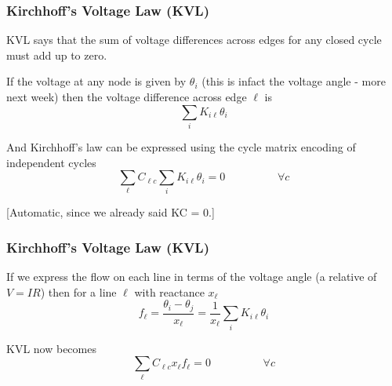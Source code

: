 \documentclass[10pt,dvipsnames]{beamer}
\begin{document}
\begin{frame}
  \frametitle{Kirchhoff's Voltage Law (KVL)}

  KVL says that the sum of voltage differences across edges for any
  closed cycle must add up to zero.

  If the voltage at any node is given by $\theta_i$ (this is infact
  the voltage \alert{angle} - more next week) then the voltage difference across edge $\ell$ is
  \begin{equation*}
    \sum_i K_{i\ell} \theta_i
  \end{equation*}

  And Kirchhoff's law can be expressed using the cycle matrix encoding of independent cycles
  \begin{equation*}
    \sum_\ell C_{\ell c} \sum_i K_{i\ell} \theta_i = 0 \hspace{2cm} \forall c
  \end{equation*}

  [Automatic, since we already said KC = 0.]


\end{frame}



\begin{frame}
  \frametitle{Kirchhoff's Voltage Law (KVL)}

  If we express the flow on each line in terms of the voltage angle (a
  relative of $V = IR$) then for a line $\ell$ with reactance $x_\ell$
  \begin{equation*}
    f_\ell = \frac{\theta_i - \theta_j}{x_\ell} = \frac{1}{x_\ell}\sum_{i} K_{i\ell} \theta_i
  \end{equation*}

  KVL now becomes
  \begin{equation*}
    \sum_\ell C_{\ell c} x_\ell f_\ell = 0 \hspace{2cm} \forall c
  \end{equation*}

\end{frame}
\end{document}
